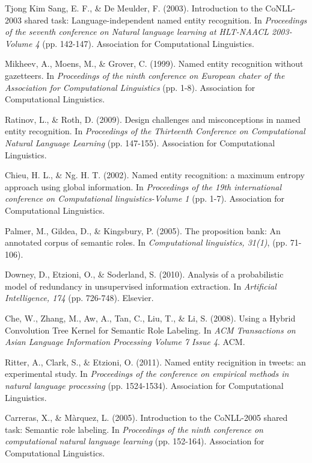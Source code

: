 \documentclass[12pt,a4paper]{article}
\begin{document}
\begin{thebibliography}{9}
  Tjong Kim Sang, E. F., \& De Meulder, F. (2003). Introduction to the CoNLL-2003 shared task: Language-independent named entity recognition. In \textit{Proceedings of the seventh conference on Natural language learning at HLT-NAACL 2003-Volume 4} (pp. 142-147). Association for Computational Linguistics.
  
  Mikheev, A., Moens, M., \& Grover, C. (1999). Named entity recognition without gazetteers. In \textit{Proceedings of the ninth conference on European chater of the Association for Computational Linguistics} (pp. 1-8). Association for Computational Linguistics.
  
  Ratinov, L., \& Roth, D. (2009). Design challenges and misconceptions in named entity recognition. In \textit{Proceedings of the Thirteenth Conference on Computational Natural Language Learning} (pp. 147-155). Association for Computational Linguistics.
  
  Chieu, H. L., \& Ng. H. T. (2002). Named entity recognition: a maximum entropy approach using global information. In \textit{Proceedings of the 19th international conference on Computational linguistics-Volume 1} (pp. 1-7). Association for Computational Linguistics.
  
  Palmer, M., Gildea, D., \& Kingsbury, P. (2005). The proposition bank: An annotated corpus of semantic roles. In \textit{Computational linguistics, 31(1)}, (pp. 71-106).
  
  Downey, D., Etzioni, O., \& Soderland, S. (2010). Analysis of a probabilistic model of redundancy in unsupervised information extraction. In \textit{Artificial Intelligence, 174} (pp. 726-748). Elsevier.
  
  Che, W., Zhang, M., Aw, A., Tan, C., Liu, T., \& Li, S. (2008). Using a Hybrid Convolution Tree Kernel for Semantic Role Labeling. In \textit{ACM Transactions on Asian Language Information Processing Volume 7 Issue 4}. ACM.

  Ritter, A., Clark, S., \& Etzioni, O. (2011).
  Named entity recignition in tweets: an experimental study. In \textit{Proceedings of the conference on empirical methods in natural language processing} (pp. 1524-1534). Association for Computational Linguistics.
  
  Carreras, X., \& Màrquez, L. (2005). Introduction to the CoNLL-2005 shared task: Semantic role labeling. In \textit{Proceedings of the ninth conference on computational natural language learning} (pp. 152-164). Association for Computational Linguistics.
  

\end{thebibliography}
\end{document}
